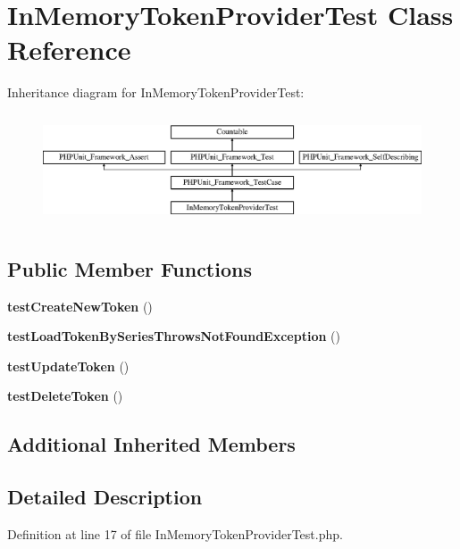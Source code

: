 \section{In\+Memory\+Token\+Provider\+Test Class Reference}
\label{class_symfony_1_1_component_1_1_security_1_1_core_1_1_tests_1_1_authentication_1_1_remember_me_1c0ae93322ff69c501165d4a5218e76ad}
Inheritance diagram for In\+Memory\+Token\+Provider\+Test\+:\begin{figure}[H]
\begin{center}
\leavevmode
\includegraphics[height=3.303835cm]{class_symfony_1_1_component_1_1_security_1_1_core_1_1_tests_1_1_authentication_1_1_remember_me_1c0ae93322ff69c501165d4a5218e76ad}
\end{center}
\end{figure}
\subsection*{Public Member Functions}
\begin{DoxyCompactItemize}
\item 
{\bf test\+Create\+New\+Token} ()
\item 
{\bf test\+Load\+Token\+By\+Series\+Throws\+Not\+Found\+Exception} ()
\item 
{\bf test\+Update\+Token} ()
\item 
{\bf test\+Delete\+Token} ()
\end{DoxyCompactItemize}
\subsection*{Additional Inherited Members}


\subsection{Detailed Description}


Definition at line 17 of file In\+Memory\+Token\+Provider\+Test.\+php.



